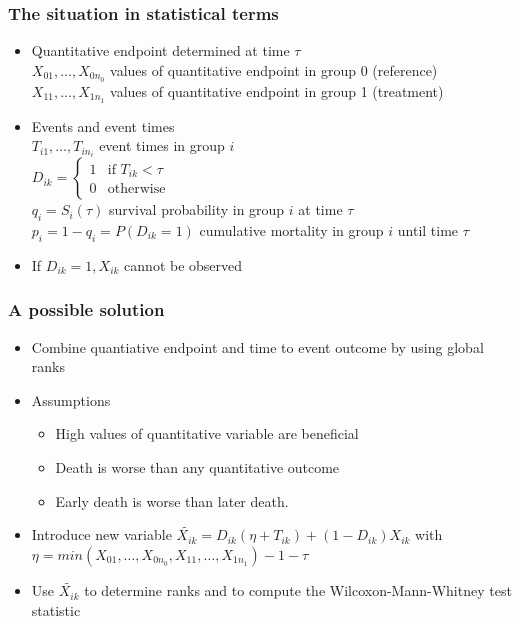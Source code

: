 \documentclass[xcolor=pdftex,dvipsnames,table]{beamer}\usepackage[]{graphicx}\usepackage[]{color}
\begin{document}
\begin{frame} %
\frametitle{The situation in statistical terms}
	\begin{itemize}
		\item Quantitative endpoint determined at time $\tau$ \\
    $X_{01}, \ldots, X_{0n_0}$  values of quantitative endpoint in group 0 (reference)\\
    $X_{11}, \ldots, X_{1n_1}$  values of quantitative endpoint in group 1 (treatment) \\
		\item Events and event times \\
		$T_{i1}, \ldots, T_{in_i}$  event times in group $i$ \\
    $D_{ik} = \begin{cases} 1 & \mbox{if } T_{ik} < \tau \\
                            0 & \mbox{otherwise} 
              \end{cases}$ \\
		$q_i = S_i(\tau) $  survival probability in group $i$ at time $\tau$ \\
		$p_i = 1 - q_i = P(D_{ik} = 1)$  cumulative mortality in group $i$ until time $\tau$ \\
		\item If $D_{ik} = 1, X_{ik}$ cannot be observed
\end{itemize}
\end{frame}

\begin{frame} %
\frametitle{A possible solution}
	\begin{itemize}
		\item Combine quantiative endpoint and time to event outcome by using global ranks
		\item Assumptions
		\begin{itemize} 
		  \item High values of quantitative variable are beneficial
		  \item Death is worse than any quantitative outcome
		  \item Early death is worse than later death.
	\end{itemize}
	\item Introduce new variable 
	     $\tilde{X_{ik}} = D_{ik}(\eta  + T_{ik}) + (1 - D_{ik})X_{ik}$ with \\
	     $\eta = min(X_{01}, \ldots, X_{0n_0}, X_{11}, \ldots, X_{1n_1}) - 1 - \tau$
	\item Use $\tilde{X_{ik}}$ to determine ranks and to compute the Wilcoxon-Mann-Whitney test statistic
\end{itemize}
\end{frame}
\end{document}

